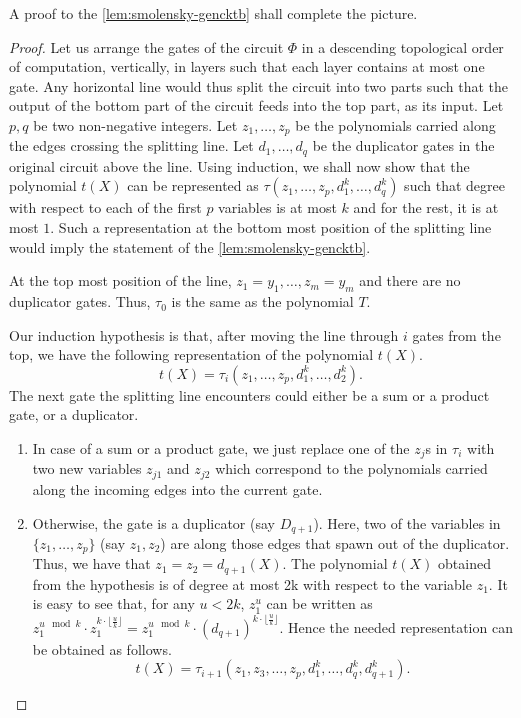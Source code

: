 A proof to the \autoref{lem:smolensky-gencktb} shall complete the picture.
\begin{proof}
  Let us arrange the gates of the circuit $\Phi$ in a descending topological order of computation, vertically, in layers such that each layer contains at most one gate. Any horizontal line would thus split the circuit into two parts such that the output of the bottom part of the circuit feeds into the top part, as its input. Let $p, q$ be two non-negative integers. Let $z_1, \dots, z_p$ be the polynomials carried along the edges crossing the splitting line. Let $d_1, \dots, d_q$ be the duplicator gates in the original circuit above the line. Using induction, we shall now show that the polynomial $t(X)$ can be represented as $\tau(z_1, \dots, z_p, d_1^k, \dots, d_q^k)$ such that degree with respect to each of the first $p$ variables is at most $k$ and for the rest, it is at most $1$. Such a representation at the bottom most position of the splitting line would imply the statement of the \autoref{lem:smolensky-gencktb}.

  At the top most position of the line, $z_1 = y_1, \dots, z_m = y_m$ and there are no duplicator gates. Thus, $\tau_0$ is the same as the polynomial $T$.

  Our induction hypothesis is that, after moving the line through $i$ gates from the top, we have the following representation of the polynomial $t(X)$. 
  $$ t(X) = \tau_i(z_1, \dots, z_p, d_1^k, \dots, d_2^k).$$
  The next gate the splitting line encounters could either be a sum or a product gate, or a duplicator.
  \begin{enumerate}
  \item In case of a sum or a product gate, we just replace one of the $z_j$s in $\tau_i$ with two new variables $z_{j1}$ and $z_{j2}$ which correspond to the polynomials carried along the incoming edges into the current gate.
  \item Otherwise, the gate is a duplicator (say $D_{q+1}$). Here, two of the variables in $\{z_1, \dots, z_p\}$ (say $z_1, z_2$) are along those edges that spawn out of the duplicator. Thus, we have that $z_1 = z_2 = d_{q+1}(X)$. The polynomial $t(X)$ obtained from the hypothesis is of degree at most 2k with respect to the variable $z_1$. It is easy to see that, for any $u < 2k$, $ z_1^u$ can be written as $z_1^{u\mod k}\cdot z_1^{k\cdot\lfloor\frac{u}{k}\rfloor} = z_1^{u\mod k}\cdot (d_{q+1})^{k\cdot\lfloor\frac{u}{k}\rfloor}$. Hence the needed representation can be obtained as follows.
    $$t(X) = \tau_{i+1}(z_1, z_3, \dots, z_p, d_1^k, \dots, d_q^k, d_{q+1}^k).$$
  \end{enumerate}
\end{proof}


